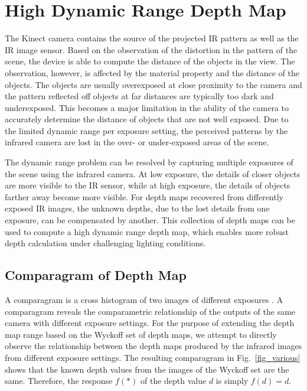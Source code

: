 \section{High Dynamic Range Depth Map}
\label{sec_hdr_depth_map}
The Kinect camera contains the source of the projected IR pattern as well as the IR image sensor. Based on the observation of the distortion in the pattern of the scene, the device is able to compute the distance of the objects in the view. The observation, however, is affected by the material property and the distance of the objects. The objects are usually overexposed at close proximity to the camera and the pattern reflected off  objects at far distances are typically too dark and underexposed. This becomes a major limitation in the ability of the camera to accurately determine the distance of objects that are not well exposed. Due to the limited dynamic range per exposure setting, the perceived patterns by the infrared camera are lost in the over- or under-exposed areas of the scene.

The dynamic range problem can be resolved by capturing multiple exposures of the scene using the infrared camera. At low exposure, the details of closer objects are more visible to the IR sensor, while at high exposure, the details of objects farther away become more visible. For depth maps recovered from differently exposed IR images, the unknown depths, due to the lost details from one exposure, can be compensated by another. This collection of depth maps can be used to compute a high dynamic range depth map, which enables more robust depth calculation under challenging lighting conditions.

\subsection{Comparagram of Depth Map}

A comparagram is a cross histogram of two images of different exposures \cite{mannwyckofftr}. A comparagram reveals the comparametric relationship of the outputs of the same camera with different exposure settings. For the purpose of extending the depth map range based on the Wyckoff set of depth maps, we attempt to directly observe the relationship between the depth maps produced by the infrared images from different exposure settings. The resulting comparagram in Fig.~\ref{fig_various} shows that the known depth values from the images of the Wyckoff set are the same. Therefore, the response $f(*)$ of the depth value $d$ is simply $f(d) = d$.

